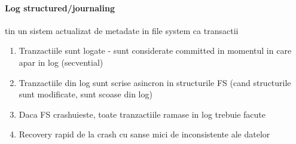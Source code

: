 \documentclass{article}
\begin{document}
\paragraph*{Log structured/journaling} tin un sistem actualizat de metadate in file system ca transactii
\begin{enumerate}
    \item Tranzactiile sunt logate - sunt considerate committed in momentul in care apar in log (secvential)
    \item Tranzactiile din log sunt scrise asincron in structurile FS (cand structurile sunt modificate, sunt scoase din log)
    \item Daca FS crashuieste, toate tranzactiile ramase in log trebuie facute
    \item Recovery rapid de la crash cu sanse mici de inconsistente ale datelor
\end{enumerate}
\end{document}
